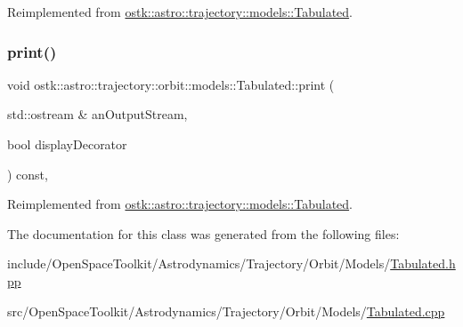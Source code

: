 Reimplemented from \hyperlink{classostk_1_1astro_1_1trajectory_1_1models_1_1_tabulated_a9d206aee35ebabe4b36ddfc057142f16}{ostk\+::astro\+::trajectory\+::models\+::\+Tabulated}.

\mbox{\label{classostk_1_1astro_1_1trajectory_1_1orbit_1_1models_1_1_tabulated_a66be3f1f23a464c666c38a3adcc3bab5}} 
\subsubsection{\texorpdfstring{print()}{print()}}
{\footnotesize\ttfamily void ostk\+::astro\+::trajectory\+::orbit\+::models\+::\+Tabulated\+::print (\begin{DoxyParamCaption}\item[{std\+::ostream \&}]{an\+Output\+Stream,  }\item[{bool}]{display\+Decorator }\end{DoxyParamCaption}) const\hspace{0.3cm}{\ttfamily [override]}, {\ttfamily [virtual]}}



Reimplemented from \hyperlink{classostk_1_1astro_1_1trajectory_1_1models_1_1_tabulated_a330bfffa50eb77eb7f6d45cfec1e9e29}{ostk\+::astro\+::trajectory\+::models\+::\+Tabulated}.



The documentation for this class was generated from the following files\+:\begin{DoxyCompactItemize}
\item 
include/\+Open\+Space\+Toolkit/\+Astrodynamics/\+Trajectory/\+Orbit/\+Models/\hyperlink{_orbit_2_models_2_tabulated_8hpp}{Tabulated.\+hpp}\item 
src/\+Open\+Space\+Toolkit/\+Astrodynamics/\+Trajectory/\+Orbit/\+Models/\hyperlink{_orbit_2_models_2_tabulated_8cpp}{Tabulated.\+cpp}\end{DoxyCompactItemize}
